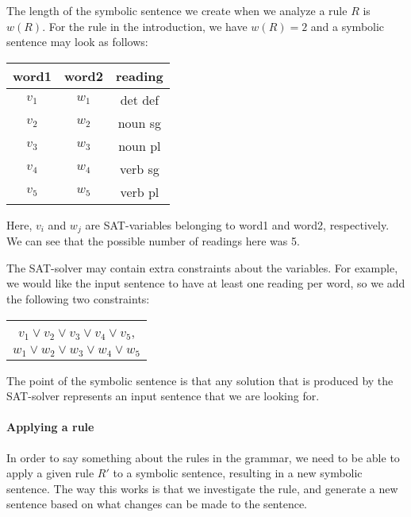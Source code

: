 The length of the symbolic sentence we create when we analyze a rule $R$ is $w(R)$. For the rule in the introduction, we have $w(R)=2$ and a symbolic sentence may look as follows:
\begin{center}
\begin{tabular}{c|c|c}
word1 & word2 & reading \\
\hline
$v_1$ & $w_1$ & det def \\
$v_2$ & $w_2$ & noun sg \\
$v_3$ & $w_3$ & noun pl \\
$v_4$ & $w_4$ & verb sg \\
$v_5$ & $w_5$ & verb pl \\
\end{tabular}
\end{center}
Here, $v_i$ and $w_j$ are SAT-variables belonging to word1 and word2, respectively. We can see that the possible number of readings here was 5.

The SAT-solver may contain extra constraints about the variables. For example, we would like the input sentence to have at least one reading per word, so we add the following two constraints:
\begin{center}
\begin{tabular}{c}
$v_1 \vee v_2 \vee v_3 \vee v_4 \vee v_5$, \\
$w_1 \vee w_2 \vee w_3 \vee w_4 \vee w_5$ \\
\end{tabular}
\end{center}
The point of the symbolic sentence is that any solution that is produced by the SAT-solver represents an input sentence that we are looking for.

\paragraph{Applying a rule}

In order to say something about the rules in the grammar, we need to be able to apply a given rule $R'$ to a symbolic sentence, resulting in a new symbolic sentence. The way this works is that we investigate the rule, and generate a new sentence based on what changes can be made to the sentence.

